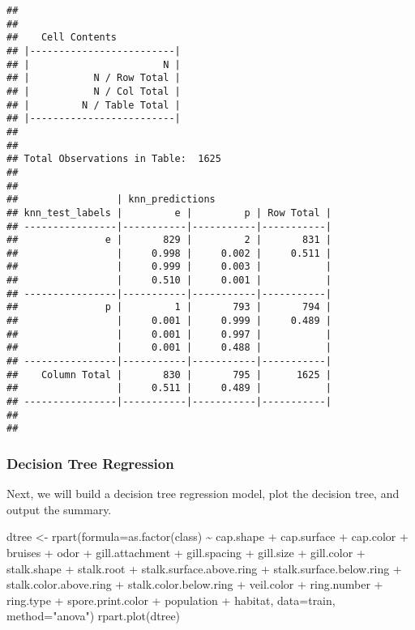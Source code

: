 \documentclass[
]{article}
\newenvironment{Shaded}{\begin{snugshade}}{\end{snugshade}}
\newcommand{\AttributeTok}[1]{\textcolor[rgb]{0.77,0.63,0.00}{#1}}
\newcommand{\FunctionTok}[1]{\textcolor[rgb]{0.00,0.00,0.00}{#1}}
\newcommand{\NormalTok}[1]{#1}
\newcommand{\OtherTok}[1]{\textcolor[rgb]{0.56,0.35,0.01}{#1}}
\newcommand{\SpecialCharTok}[1]{\textcolor[rgb]{0.00,0.00,0.00}{#1}}
\newcommand{\StringTok}[1]{\textcolor[rgb]{0.31,0.60,0.02}{#1}}
\begin{document}
\begin{verbatim}
## 
##  
##    Cell Contents
## |-------------------------|
## |                       N |
## |           N / Row Total |
## |           N / Col Total |
## |         N / Table Total |
## |-------------------------|
## 
##  
## Total Observations in Table:  1625 
## 
##  
##                 | knn_predictions 
## knn_test_labels |         e |         p | Row Total | 
## ----------------|-----------|-----------|-----------|
##               e |       829 |         2 |       831 | 
##                 |     0.998 |     0.002 |     0.511 | 
##                 |     0.999 |     0.003 |           | 
##                 |     0.510 |     0.001 |           | 
## ----------------|-----------|-----------|-----------|
##               p |         1 |       793 |       794 | 
##                 |     0.001 |     0.999 |     0.489 | 
##                 |     0.001 |     0.997 |           | 
##                 |     0.001 |     0.488 |           | 
## ----------------|-----------|-----------|-----------|
##    Column Total |       830 |       795 |      1625 | 
##                 |     0.511 |     0.489 |           | 
## ----------------|-----------|-----------|-----------|
## 
## 
\end{verbatim}

\hypertarget{decision-tree-regression}{%
\subsubsection{Decision Tree
Regression}\label{decision-tree-regression}}

Next, we will build a decision tree regression model, plot the decision
tree, and output the summary.

\begin{Shaded}
\begin{Highlighting}[]
\NormalTok{dtree }\OtherTok{\textless{}{-}} \FunctionTok{rpart}\NormalTok{(}\AttributeTok{formula=}\FunctionTok{as.factor}\NormalTok{(class) }\SpecialCharTok{\textasciitilde{}}\NormalTok{ cap.shape }\SpecialCharTok{+}\NormalTok{ cap.surface }\SpecialCharTok{+}\NormalTok{ cap.color }\SpecialCharTok{+}\NormalTok{ bruises }\SpecialCharTok{+}\NormalTok{ odor }\SpecialCharTok{+}\NormalTok{ gill.attachment }\SpecialCharTok{+}\NormalTok{ gill.spacing }\SpecialCharTok{+}\NormalTok{ gill.size }\SpecialCharTok{+}\NormalTok{ gill.color }\SpecialCharTok{+}\NormalTok{ stalk.shape }\SpecialCharTok{+}\NormalTok{ stalk.root }\SpecialCharTok{+}\NormalTok{ stalk.surface.above.ring }\SpecialCharTok{+}\NormalTok{ stalk.surface.below.ring }\SpecialCharTok{+}\NormalTok{ stalk.color.above.ring }\SpecialCharTok{+}\NormalTok{ stalk.color.below.ring }\SpecialCharTok{+}\NormalTok{ veil.color }\SpecialCharTok{+}\NormalTok{ ring.number }\SpecialCharTok{+}\NormalTok{ ring.type }\SpecialCharTok{+}\NormalTok{ spore.print.color }\SpecialCharTok{+}\NormalTok{ population }\SpecialCharTok{+}\NormalTok{ habitat, }\AttributeTok{data=}\NormalTok{train, }\AttributeTok{method=}\StringTok{"anova"}\NormalTok{)}
\FunctionTok{rpart.plot}\NormalTok{(dtree)}
\end{Highlighting}
\end{Shaded}
\end{document}
